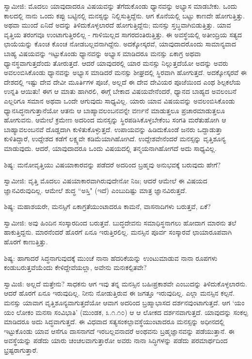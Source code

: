 ಸ್ವಾಮೀಜಿ: ಮೊದಲು ಯಾವುದಾದರೂ ವಿಷಯವನ್ನು ತೆಗೆದುಕೊಂಡು ಧ್ಯಾನವನ್ನು ಅಭ್ಯಾಸ ಮಾಡಬೇಕು. ಒಂದು ಕಾಲದಲ್ಲಿ ನಾನು ಒಂದು ಕಪ್ಪು ಬಟ್ಟಿನಲ್ಲಿ ಮನಸ್ಸನ್ನು ನಿಲ್ಲಿಸುತ್ತಿದ್ದೆನು. ಆಗ ಕೊನೆಯಲ್ಲಿ ಬಟ್ಟು ಕಾಣದೇ ಹೋಗುತ್ತಿತ್ತು. ಅಥವಾ ಮುಂದೆ ಏನಿದೆ ಅದನ್ನು ತಿಳಿದುಕೊಳ್ಳಲಾರದೆ ಹೋಗುತ್ತಿದ್ದೆನು; ಮನಸ್ಸು ಸ್ತಬ್ಧವಾಗಿಬಿಡುತ್ತಿತ್ತು. ಯಾವ ವೃತ್ತಿಯ ತರಂಗವೂ ಉಂಟಾಗುತ್ತಿರಲಿಲ್ಲ - ಗಾಳಿಯಿಲ್ಲದ ಸಾಗರದಂತಿರುತ್ತಿತ್ತು. ಈ ಅವಸ್ಥೆಯಲ್ಲಿ ಅತೀಂದ್ರಿಯ ಸತ್ಯದ ಛಾಯೆಯನ್ನು ಕೊಂಚ ಕೊಂಚ ನೋಡಬಲ್ಲವನಾಗಿದ್ದೆನು. ಅದಕ್ಕೋಸ್ಕರವೆ, ಯಾವುದಾದರೊಂದು ಸಾಮಾನ್ಯವಾದ ಬಾಹ್ಯ ವಿಷಯವನ್ನು ಇಟ್ಟುಕೊಂಡು ಧ್ಯಾನವನ್ನು ಅಭ್ಯಾಸ ಮಾಡಿದರೂ ಮನಸ್ಸು ಏಕಾಗ್ರ ಅಥವಾ ಧ್ಯಾನಸ್ಥವಾಗುತ್ತದೆಂದು ತೋರುತ್ತದೆ. ಆದರೆ ಯಾವುದರಲ್ಲಿ ಯಾರ ಮನಸ್ಸು ನಿಲ್ಲುತ್ತದೆಯೋ ಅದನ್ನು ಅವರು ಅವಲಂಬಿಸಿಕೊಂಡು ಧ್ಯಾನವನ್ನು ಅಭ್ಯಾಸ ಮಾಡಿದರೆ ಮನಸ್ಸು ಶೀಘ್ರದಲ್ಲಿ ಸ್ಥಿರವಾಗಿ ಹೋಗುತ್ತದೆ. ಅದಕ್ಕೋಸ್ಕರವೆ ಈ ದೇಶದಲ್ಲಿ ಇಷ್ಟು ದೇವ ದೇವೀ ಮೂರ್ತಿಗಳ ಪೂಜೆ, ಅಲ್ಲದೆ ಈ ದೇವ ದೇವಿಯರ ಪೂಜೆಯಿಂದ ಎಂಥ ಶಿಲ್ಪಕಲೆಯ ಉನ್ನತಿ ಆಯಿತು! ಈಗ ಆ ಮಾತು ಹಾಗಿರಲಿ, ಈಗ್ಗೆ ಬೇಕಾದ ವಿಷಯವೇನೆಂದರೆ, ಧ್ಯಾನದ ಬಾಹ್ಯದ ಅವಲಂಬನೆ ಎಲ್ಲರಿಗೂ ಸಮಾನ ಅಥವಾ ಒಂದೇ ಆಗುವುದು ಸಾಧ್ಯವಿಲ್ಲ. ಯಾರು ಯಾವ ವಿಷಯವನ್ನು ಅವಲಂಬಿಸಿಕೊಂಡು ಧ್ಯಾನಸಿದ್ಧನಾಗುತ್ತಾನೆಯೋ ಆತನು ಆ ಬಾಹ್ಯಾವಲಂಬನವನ್ನೇ ವರ್ಣನೆ ಮಾಡುತ್ತಲೂ ಪ್ರಚಾರಮಾಡುತ್ತಲೂ ಹೋಗುವನು. ಆಮೇಲೆ ಕ್ರಮೇಣ ಅದರಿಂದ ಮನಸ್ಸನ್ನು ಸ್ಥಿರಪಡಿಸಿಕೊಳ್ಳಬೇಕೆಂಬ ಸಂಗತಿ ಮರೆತುಹೋಗಿ ಆ ಬಾಹ್ಯಾವಲಂಬನವೆ ದೊಡ್ಡದಾಗಿ ಕುಳಿತುಕೊಳ್ಳುತ್ತದೆ. ಉಪಾಯವನ್ನು ಹಿಡಿದುಕೊಂಡೆ ಜನರು ಒದ್ದಾಡುತ್ತಾ ಕುಳಿತಿದ್ದಾರೆ, ಉದ್ದೇಶದ ಕಡೆಗೆ ಲಕ್ಷ್ಯವೇ ಕಡಿಮೆಯಾಗಿಹೋಗಿದೆ. ಉದ್ದೇಶವೇನೆಂದರೆ ಮನಸ್ಸನ್ನು ವೃತ್ತಿಶೂನ್ಯ ಮಾಡುವುದು. ಆದರೆ, ಯಾವುದಾದರೂ ಒಂದು ವಿಷಯದಲ್ಲಿ ತನ್ಮಯನಾಗಿಹೋಗದೆ ಅದು ಸಾಧ್ಯವಿಲ್ಲ.

ಶಿಷ್ಯ: ಮನೋವೃತ್ತಿಯು ವಿಷಯಾಕಾರವನ್ನು ಪಡೆದರೆ ಅದರಿಂದ ಬ್ರಹ್ಮವು ಅನುಭವಕ್ಕೆ ಬರುವುದು ಹೇಗೆ?

ಸ್ವಾಮೀಜಿ: ವೃತ್ತಿ ಮೊದಲು ವಿಷಯಾಕಾರವಾಗಿರುವುದೇನೋ ನಿಜ; ಆದರೆ ಆಮೇಲೆ ಈ ವಿಷಯದ ಜ್ಞಾನವಿರುವುದಿಲ್ಲ. ಆಮೇಲೆ ಶುದ್ಧ “ಅಸ್ತಿ" (ಇದೆ) ಎಂಬುದಿಷ್ಟು ಮಾತ್ರ ಜ್ಞಾನವಿರುತ್ತದೆ.

ಶಿಷ್ಯ: ಮಹಾಶಯರೇ, ಮನಸ್ಸಿಗೆ ಏಕಾಗ್ರತೆಯುಂಟಾದರೂ ಕಾಮನೆ, ವಾಸನಾದಿಗಳು ಬರುತ್ತವೆ, ಏಕೆ?

ಸ್ವಾಮೀಜಿ: ಅವು ಹಿಂದಿನ ಸಂಸ್ಕಾರದಿಂದ ಬರುತ್ತವೆ. ಬುದ್ಧದೇವನು ಸಮಾಧಿಸ್ಥನಾಗಲು ಹೋದಾಗ ಮಾರನು ತಲೆ ಹಾಕುತ್ತಿದ್ದನು. ಮಾರನೆಂದರೆ ಹೊರಗೆ ಏನೂ ಇರುತ್ತಿರಲಿಲ್ಲ. ಮನಸ್ಸಿನ ಪೂರ್ವ ಸಂಸ್ಕಾರವೆ ಛಾಯಾರೂಪವಾಗಿ ಹೊರಗೆ ಕಾಣುತ್ತಿತ್ತು.

ಶಿಷ್ಯ: ಹಾಗಾದರೆ ಸಿದ್ಧನಾಗುವುದಕ್ಕೆ ಮುಂಚೆ ನಾನಾ ಹೆದರಿಕೆಯನ್ನು ಉಂಟುಮಾಡುವ ನಾನಾ ರೂಪಗಳು ಕಂಡುಬರುತ್ತವೆಯೆಂದು ಕೇಳಿದ್ದೇವೆಯಲ್ಲಾ, ಅವೇನು ಮನಃಕಲ್ಪಿತವೇ?

ಸ್ವಾಮಿಜಿ: ಅಲ್ಲದೆ ಮತ್ತೇನು? ಸಾಧಕನು ಆಗ ಇವು ತನ್ನ ಮನಸ್ಸಿನ ಬಹಿಃಪ್ರಕಾಶವೇ ಎಂಬುದನ್ನು ತಿಳಿದುಕೊಳ್ಳಲಾರನು. ಆದರೆ ಹೊರಗೆ ಏನೂ ಇರುವುದಿಲ್ಲ. ನೀನು ನೋಡುತ್ತಿರುವ ಈ ಜಗತ್ತೂ ಇರುವುದಿಲ್ಲ. ಎಲ್ಲಾ ಮನಸ್ಸಿನ ಕಲ್ಪನೆ. ಮನಸ್ಸು ಯಾವಾಗ ವೃತ್ತಿಶೂನ್ಯವಾಗುತ್ತದೆಯೋ ಆವಾಗ ಅದರಿಂದ ಬ್ರಹ್ಮಾಭಾಸದ ದರ್ಶನವುಂಟಾಗುತ್ತದೆ. ಆಗ ‘ಯಂ ಯಂ ಲೋಕಂ ಮನಸಾ ಸಂವಿಭಾತಿ’ (ಮುಂಡಕ, ೩.೧.೧೦) ಆ ಆ ಲೋಕದ ದರ್ಶನವಾಗುತ್ತದೆ. ಯಾವುದನ್ನು ಸಂಕಲ್ಪ ಮಾಡಿದರೂ ಅದು ಸಿದ್ಧವಾಗುತ್ತದೆ. ಈ ವಿಧವಾದ ಸತ್ಯಸಂಕಲ್ಪಾವಸ್ಥೆಯುಂಟಾದರೂ ಮನಸ್ಸನ್ನು ಅಧೀನದಲ್ಲಿ ಇಟ್ಟುಕೊಂಡು ಯಾವ ಆಸೆಗೂ ದಾಸನಾಗದೆ ಇರಬಲ್ಲವನಾದರೆ ಅಂಥವನು ಬ್ರಹ್ಮಜ್ಞಾನವನ್ನು ಪಡೆಯುತ್ತಾನೆ. ಈ ಅವಸ್ಥೆಯನ್ನು ಪಡೆದು ಯಾರು ಚಂಚಲವಾಗುತ್ತಾರೋ ಅವರು ನಾನಾ ಸಿದ್ಧಿಗಳನ್ನು ಪಡೆದು ಪರಮಾರ್ಥದಿಂದ ಭ್ರಷ್ಟರಾಗುತ್ತಾರೆ.

